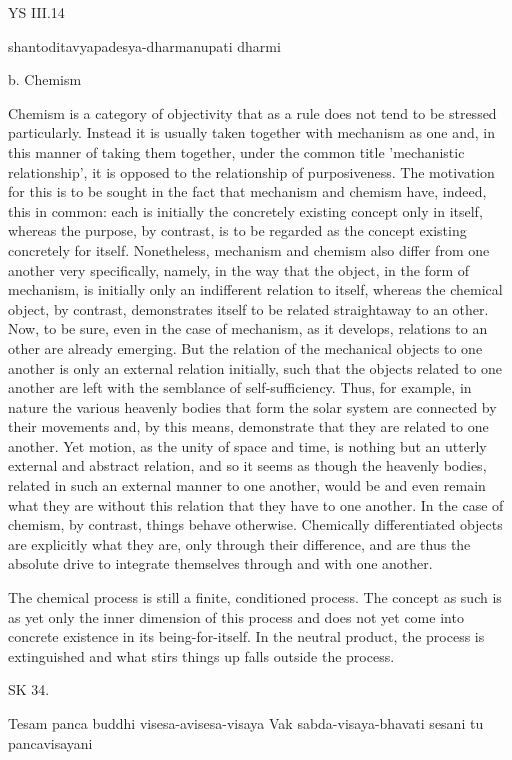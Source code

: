 YS III.14

shantoditavyapadesya-dharmanupati dharmi

b. Chemism

Chemism is a category of objectivity that as a rule does not tend
to be stressed particularly.
Instead it is usually taken together with mechanism as one and,
in this manner of taking them together, under the common title
'mechanistic relationship', it is opposed to the relationship of purposiveness.
The motivation for this is to be sought in the fact that
mechanism and chemism have, indeed, this in common:
each is initially the concretely existing concept only in itself,
whereas the purpose, by contrast, is to be regarded as
the concept existing concretely for itself.
Nonetheless, mechanism and chemism also differ from one another very specifically,
namely, in the way that the object, in the form of mechanism, is
initially only an indifferent relation to itself, whereas
the chemical object, by contrast, demonstrates itself to be related straightaway to an other.
Now, to be sure, even in the case of mechanism, as it develops,
relations to an other are already emerging.
But the relation of the mechanical objects to one another is only
an external relation initially, such that the objects related
to one another are left with the semblance of self-sufficiency.
Thus, for example, in nature the various heavenly bodies that
form the solar system are connected by their movements and,
by this means, demonstrate that they are related to one another.
Yet motion, as the unity of space and time, is nothing but
an utterly external and abstract relation,
and so it seems as though the heavenly bodies,
related in such an external manner to one another,
would be and even remain what they are without this relation
that they have to one another.
In the case of chemism, by contrast, things behave otherwise.
Chemically differentiated objects are explicitly what they are,
only through their difference, and are thus the absolute drive
to integrate themselves through and with one another.

The chemical process is still a finite, conditioned process.
The concept as such is as yet only the inner dimension of this process and
does not yet come into concrete existence in its being-for-itself.
In the neutral product, the process is extinguished and
what stirs things up falls outside the process.

SK 34.

Tesam panca buddhi visesa-avisesa-visaya
Vak sabda-visaya-bhavati sesani tu pancavisayani

